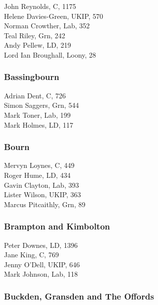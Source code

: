 \documentclass[a4paper,openany,10pt]{book}
\begin{document}
John Reynolds, C, 1175\\
Helene Davies-Green, UKIP, 570\\
Norman Crowther, Lab, 352\\
Teal Riley, Grn, 242\\
Andy Pellew, LD, 219\\
Lord Ian Broughall, Loony, 28\\


\subsubsection*{Bassingbourn}



Adrian Dent, C, 726\\
Simon Saggers, Grn, 544\\
Mark Toner, Lab, 199\\
Mark Holmes, LD, 117\\


\subsubsection*{Bourn}



Mervyn Loynes, C, 449\\
Roger Hume, LD, 434\\
Gavin Clayton, Lab, 393\\
Lister Wilson, UKIP, 363\\
Marcus Pitcaithly, Grn, 89\\


\subsubsection*{Brampton and Kimbolton}



Peter Downes, LD, 1396\\
Jane King, C, 769\\
Jenny O'Dell, UKIP, 646\\
Mark Johnson, Lab, 118\\


\subsubsection*{Buckden, Gransden and The Offords}
\end{document}
